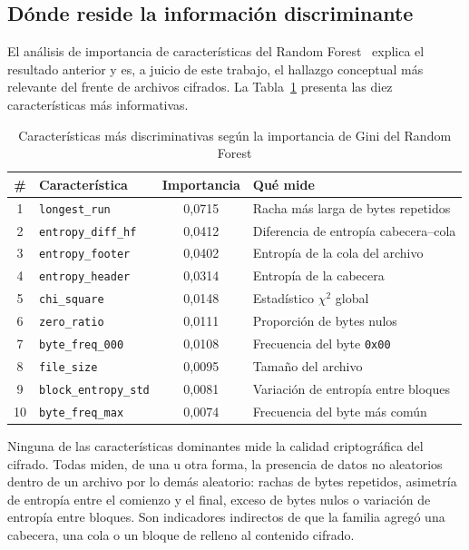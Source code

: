 \subsection{Dónde reside la información discriminante}
\label{subsec:exp2_donde}

El análisis de importancia de características del Random Forest~\cite{breiman2001} explica el resultado anterior y es, a juicio de este trabajo, el hallazgo conceptual más relevante del frente de archivos cifrados. La Tabla~\ref{tab:exp2_importancias} presenta las diez características más informativas.

\begin{table}[ht]
\centering
\caption{Características más discriminativas según la importancia de Gini del Random Forest}
\label{tab:exp2_importancias}
\begin{tabular}{|c|l|c|l|}
\hline
\textbf{\#} & \textbf{Característica} & \textbf{Importancia} & \textbf{Qué mide} \\
\hline
1 & \texttt{longest\_run} & 0,0715 & Racha más larga de bytes repetidos \\
2 & \texttt{entropy\_diff\_hf} & 0,0412 & Diferencia de entropía cabecera--cola \\
3 & \texttt{entropy\_footer} & 0,0402 & Entropía de la cola del archivo \\
4 & \texttt{entropy\_header} & 0,0314 & Entropía de la cabecera \\
5 & \texttt{chi\_square} & 0,0148 & Estadístico $\chi^2$ global \\
6 & \texttt{zero\_ratio} & 0,0111 & Proporción de bytes nulos \\
7 & \texttt{byte\_freq\_000} & 0,0108 & Frecuencia del byte \texttt{0x00} \\
8 & \texttt{file\_size} & 0,0095 & Tamaño del archivo \\
9 & \texttt{block\_entropy\_std} & 0,0081 & Variación de entropía entre bloques \\
10 & \texttt{byte\_freq\_max} & 0,0074 & Frecuencia del byte más común \\
\hline
\end{tabular}
\end{table}

Ninguna de las características dominantes mide la calidad criptográfica del cifrado. Todas miden, de una u otra forma, la presencia de datos no aleatorios dentro de un archivo por lo demás aleatorio: rachas de bytes repetidos, asimetría de entropía entre el comienzo y el final, exceso de bytes nulos o variación de entropía entre bloques. Son indicadores indirectos de que la familia agregó una cabecera, una cola o un bloque de relleno al contenido cifrado.


